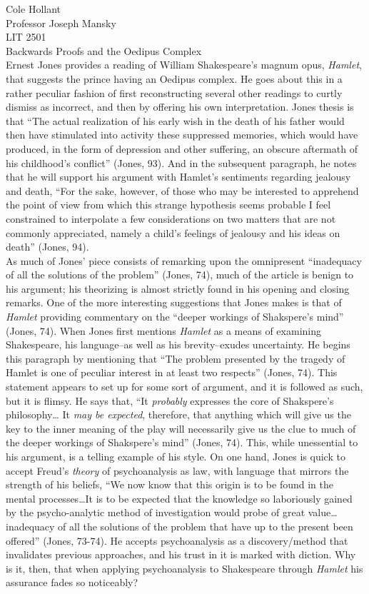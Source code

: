 \documentclass[12pt]{article}
\begin{document}
\raggedright
{\large Cole Hollant}\\
{\large Professor Joseph Mansky}\\
{\large LIT 2501}\\
{\LARGE Backwards Proofs and the Oedipus Complex}\\
\indent Ernest Jones provides a reading of William Shakespeare's magnum opus, \textit{Hamlet}, that suggests the prince having an Oedipus complex. He goes about this in a rather peculiar fashion of first reconstructing several other readings to curtly dismiss as incorrect, and then by offering his own interpretation. Jones thesis is that ``The actual realization of his early wish in the death of his father would then have stimulated into activity these suppressed memories, which would have produced, in the form of depression and other suffering, an obscure aftermath of his childhood's conflict'' (Jones, 93). And in the subsequent paragraph, he notes that he will support his argument with Hamlet's sentiments regarding jealousy and death, ``For the sake, however, of those who may be interested to apprehend the point of view from which this strange hypothesis seems probable I feel constrained to interpolate a few considerations on two matters that are not commonly appreciated, namely a child's feelings of jealousy and his ideas on death'' (Jones, 94).\\
\indent As much of Jones' piece consists of remarking upon the omnipresent ``inadequacy of all the solutions of the problem'' (Jones, 74), much of the article is benign to his argument; his theorizing is almost strictly found in his opening and closing remarks. One of the more interesting suggestions that Jones makes is that of \textit{Hamlet} providing commentary on the ``deeper workings of Shakspere's mind'' (Jones, 74). When Jones first mentions \textit{Hamlet} as a means of examining Shakespeare, his language--as well as his brevity--exudes uncertainty. He begins this paragraph by mentioning that ``The problem presented by the tragedy of Hamlet is one of peculiar interest in at least two respects'' (Jones, 74). This statement appears to set up for some sort of argument, and it is followed as such, but it is flimsy. He says that, ``It \textit{probably} expresses the core of Shakspere's philosophy… It \textit{may be expected}, therefore, that anything which will give us the key to the inner meaning of the play will necessarily give us the clue to much of the deeper workings of Shakspere's mind'' (Jones, 74). This, while unessential to his argument, is a telling example of his style. On one hand, Jones is quick to accept Freud's \textit{theory} of psychoanalysis as law, with language that mirrors the strength of his beliefs, ``We now know that this origin is to be found in the mental processes…It is to be expected that the knowledge so laboriously gained by the psycho-analytic method of investigation would probe of great value… inadequacy of all the solutions of the problem that have up to the present been offered'' (Jones, 73-74). He accepts psychoanalysis as a discovery/method that invalidates previous approaches, and his trust in it is marked with diction. Why is it, then, that when applying psychoanalysis to Shakespeare through \textit{Hamlet} his assurance fades so noticeably?\\
\end{document}
